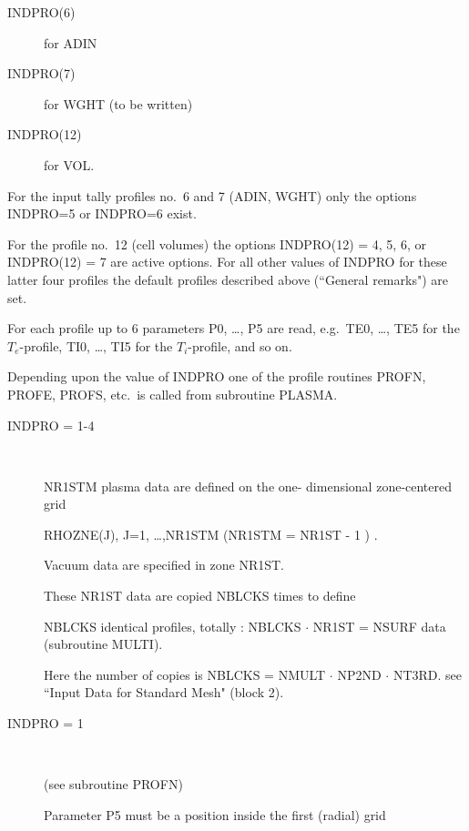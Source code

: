 \begin{description}
\begin{description}
          \item[INDPRO(6)] for ADIN

          \item[INDPRO(7)] for WGHT (to be written)

          \item[INDPRO(12)] for VOL.

        \end{description}

        For the input tally profiles no.\ 6 and 7 (ADIN, WGHT) only the options
        INDPRO=5 or INDPRO=6 exist.

        For the profile no.\ 12 (cell volumes) the options INDPRO(12) = 4, 5, 6, or
        INDPRO(12) = 7 are active options.
        For all other values of INDPRO for these latter four profiles the default
        profiles described above (``General remarks") are set.

        For each profile up to 6 parameters P0, \dots, P5 are read, e.g.\ TE0, \dots,
        TE5 for the $T_e $-profile, TI0, \dots, TI5 for the $T_i $-profile, and so on.

        Depending upon the value of INDPRO one of the profile routines PROFN, PROFE,
        PROFS, etc.\ is called from subroutine PLASMA.
        \begin{description}
          \item[INDPRO = 1-4] ~

                NR1STM plasma data are defined on the one- dimensional zone-centered grid

                RHOZNE(J), J=1, \ldots,NR1STM	(NR1STM = NR1ST - 1 ) .

                Vacuum data are specified in zone NR1ST.

                These \hfill NR1ST \hfill data \hfill are \hfill copied \hfill NBLCKS \hfill
                times \hfill to \hfill define

                NBLCKS identical profiles, totally : NBLCKS $\cdot$ NR1ST = NSURF data
                (subroutine MULTI).

                Here the number of copies is NBLCKS = NMULT $\cdot$ NP2ND $\cdot$ NT3RD.
                see ``Input Data for Standard Mesh" (block 2).
          \item[INDPRO = 1] ~

                (see subroutine PROFN)

                Parameter P5 must be a position inside the first (radial) grid


\end{description}
\end{description}
